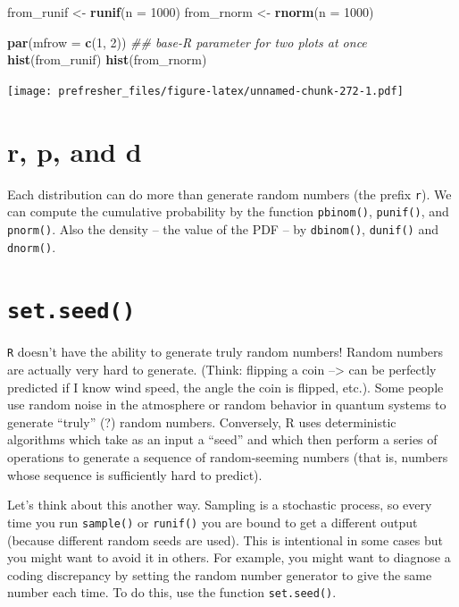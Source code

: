 \documentclass[
]{book}
\newenvironment{Shaded}{\begin{snugshade}}{\end{snugshade}}
\newcommand{\CommentTok}[1]{\textcolor[rgb]{0.56,0.35,0.01}{\textit{#1}}}
\newcommand{\DataTypeTok}[1]{\textcolor[rgb]{0.13,0.29,0.53}{#1}}
\newcommand{\DecValTok}[1]{\textcolor[rgb]{0.00,0.00,0.81}{#1}}
\newcommand{\KeywordTok}[1]{\textcolor[rgb]{0.13,0.29,0.53}{\textbf{#1}}}
\newcommand{\NormalTok}[1]{#1}
\newcommand{\StringTok}[1]{\textcolor[rgb]{0.31,0.60,0.02}{#1}}
\theoremstyle{definition}
\theoremstyle{definition}
\theoremstyle{definition}
\theoremstyle{remark}
\begin{document}
\begin{Shaded}
\begin{Highlighting}[]
\NormalTok{from\_runif <{-}}\StringTok{ }\KeywordTok{runif}\NormalTok{(}\DataTypeTok{n =} \DecValTok{1000}\NormalTok{)}
\NormalTok{from\_rnorm <{-}}\StringTok{ }\KeywordTok{rnorm}\NormalTok{(}\DataTypeTok{n =} \DecValTok{1000}\NormalTok{)}

\KeywordTok{par}\NormalTok{(}\DataTypeTok{mfrow =} \KeywordTok{c}\NormalTok{(}\DecValTok{1}\NormalTok{, }\DecValTok{2}\NormalTok{)) }\CommentTok{\#\# base{-}R parameter for two plots at once}
\KeywordTok{hist}\NormalTok{(from\_runif)}
\KeywordTok{hist}\NormalTok{(from\_rnorm)}
\end{Highlighting}
\end{Shaded}

\texttt{[image: prefresher\_files/figure-latex/unnamed-chunk-272-1.pdf]}

\hypertarget{r-p-and-d}{%
\section{r, p, and d}\label{r-p-and-d}}

Each distribution can do more than generate random numbers (the prefix \texttt{r}). We can compute the cumulative probability by the function \texttt{pbinom()}, \texttt{punif()}, and \texttt{pnorm()}. Also the density -- the value of the PDF -- by \texttt{dbinom()}, \texttt{dunif()} and \texttt{dnorm()}.

\hypertarget{set.seed}{%
\section{\texorpdfstring{\texttt{set.seed()}}{set.seed()}}\label{set.seed}}

\texttt{R} doesn't have the ability to generate truly random numbers! Random numbers are actually very hard to generate. (Think: flipping a coin --\textgreater{} can be perfectly predicted if I know wind speed, the angle the coin is flipped, etc.). Some people use random noise in the atmosphere or random behavior in quantum systems to generate ``truly'' (?) random numbers. Conversely, R uses deterministic algorithms which take as an input a ``seed'' and which then perform a series of operations to generate a sequence of random-seeming numbers (that is, numbers whose sequence is sufficiently hard to predict).

Let's think about this another way. Sampling is a stochastic process, so every time you run \texttt{sample()} or \texttt{runif()} you are bound to get a different output (because different random seeds are used). This is intentional in some cases but you might want to avoid it in others. For example, you might want to diagnose a coding discrepancy by setting the random number generator to give the same number each time. To do this, use the function \texttt{set.seed()}.
\end{document}
